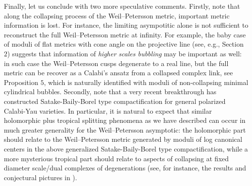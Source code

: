 \documentclass[11pt]{amsart}
\theoremstyle{plain}
\theoremstyle{definition}
\theoremstyle{remark}
\begin{document}
Finally, let us conclude with two more speculative comments. Firstly, note that along the collapsing process of the Weil--Petersson metric, important metric information is lost. For instance, the limiting asympotitic alone is not sufficient to reconstruct the full Weil--Petersson metric at infinity. For example, the baby case of  moduli of flat metrics with cone angle on the projective line (see, e.g., \cite{spotti25} Section $2$) suggests that information of \textit{higher scales bubbling} may be important as well: in such case the Weil--Petersson cusps degenerate to a real line, but the full metric can be recover as a Calabi's ansatz from a collapsed complex link, see \cite{BS19} Proposition $5$, which is naturally identified with moduli of non-collapsing minimal cylindrical bubbles. Secondly, note that a very recent breakthrough \cite{BFMT2025} has constructed Satake-Baily-Borel type compactification for general polarized Calabi-Yau varieties. In particular, it is natural to expect that similar holomorphic plus tropical splitting phenomena as we have described can occur in much greater generality for the Weil--Petersson asymptotic: the holomorphic part should relate to the Weil--Petersson metric generated by moduli of log canonical centers in the above generalized Satake-Baily-Borel type compactification, while a more mysterious tropical part should relate to aspects of collapsing at fixed diameter scale/dual complexes of degenerations (see, for instance, the results and conjectural pictures in \cite{Li25,Odaka22,spotti25,SZ2024}).

\printbibliography
\end{document}
